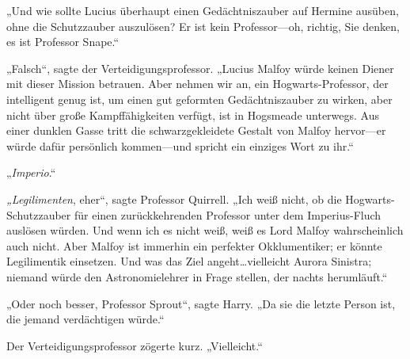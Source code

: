 „Und wie sollte Lucius überhaupt einen Gedächtniszauber auf Hermine ausüben, ohne die Schutzzauber auszulösen? Er ist kein Professor—oh, richtig, Sie denken, es ist Professor Snape.“

„Falsch“, sagte der Verteidigungsprofessor. „Lucius Malfoy würde keinen Diener mit dieser Mission betrauen. Aber nehmen wir an, ein Hogwarts-Professor, der intelligent genug ist, um einen gut geformten Gedächtniszauber zu wirken, aber nicht über große Kampffähigkeiten verfügt, ist in Hogsmeade unterwegs. Aus einer dunklen Gasse tritt die schwarzgekleidete Gestalt von Malfoy hervor—er würde dafür persönlich kommen—und spricht ein einziges Wort zu ihr.“

„\emph{Imperio}.“

\emph{„Legilimenten}, eher“, sagte Professor Quirrell. „Ich weiß nicht, ob die Hogwarts-Schutzzauber für einen zurückkehrenden Professor unter dem Imperius-Fluch auslösen würden. Und wenn ich es nicht weiß, weiß es Lord Malfoy wahrscheinlich auch nicht. Aber Malfoy ist immerhin ein perfekter Okklumentiker; er könnte Legilimentik einsetzen. Und was das Ziel angeht…vielleicht Aurora Sinistra; niemand würde den Astronomielehrer in Frage stellen, der nachts herumläuft.“

„Oder noch besser, Professor Sprout“, sagte Harry. „Da sie die letzte Person ist, die jemand verdächtigen würde.“

Der Verteidigungsprofessor zögerte kurz. „Vielleicht.“


